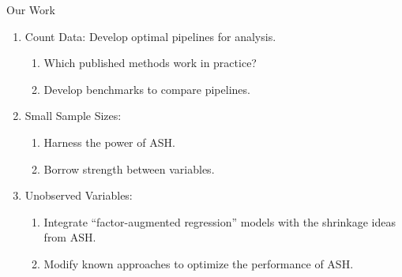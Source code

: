 \documentclass[evncountsect]{beamer}
\begin{document}
\begin{frame}{Our Work}
  \begin{enumerate}
  \item Count Data: Develop optimal pipelines for analysis.
    \begin{enumerate}
    \item Which published methods work in practice?\smallskip
    \item Develop benchmarks to compare pipelines.\medskip
    \end{enumerate}
  \item Small Sample Sizes:
    \begin{enumerate}
    \item Harness the power of ASH.\smallskip
    \item Borrow strength between variables.
    \end{enumerate}\medskip
  \item Unobserved Variables:
    \begin{enumerate}
    \item Integrate ``factor-augmented regression'' models with the
      shrinkage ideas from ASH. \smallskip
    \item Modify known approaches to optimize the performance of ASH.
    \end{enumerate}
  \end{enumerate}
\end{frame}
\end{document}
